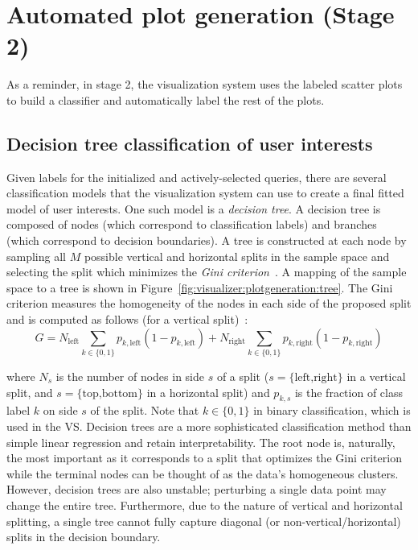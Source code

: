\section{Automated plot generation (Stage 2)}
\label{sec:visualizer:plotgeneration}

As a reminder, in stage 2, the visualization system uses the labeled scatter 
plots to build a classifier and automatically label the rest of the plots.

\subsection{Decision tree classification of user interests}
\label{sec:visualizer:plotgeneration:tree}

Given labels for the initialized and actively-selected queries, there are 
several classification models that the visualization system can use to create a 
final fitted model of user interests. One such model is a \textit{decision 
tree}. A decision tree is composed of nodes (which correspond to 
classification labels) and branches (which correspond to decision boundaries). 
A tree is constructed at each node by sampling all $M$ possible vertical and 
horizontal splits in the sample space and selecting the split which minimizes 
the \textit{Gini criterion}~\cite{cutler2010}. A mapping of the sample space to 
a tree is shown in Figure~\ref{fig:visualizer:plotgeneration:tree}. The Gini 
criterion measures the homogeneity of the nodes in each side of the proposed 
split and is computed as follows (for a vertical split)~\cite{cutler2010}:
$$G = N_{\text{left}} \sum\limits_{k\in \{0,1\}} p_{k,\text{left}} 
(1-p_{k,\text{left}}) + N_{\text{right}} 
\sum\limits_{k \in \{0,1\}}  p_{k,\text{right}}(1-p_{k,\text{right}})$$

\noindent where $N_s$ is the number of nodes in side $s$ of a split ($s = 
\{\text{left,right}\}$ in a vertical split, and $s = \{\text{top,bottom}\}$ in 
a horizontal split) and $p_{k,s}$ is the fraction of class label $k$ on side 
$s$ of the split. Note that $k \in \{0,1\}$ in binary classification, which is 
used in the VS. Decision trees are a more sophisticated classification method 
than simple linear regression and retain interpretability. The root node is, 
naturally, the most important as it corresponds to a split that optimizes the 
Gini criterion while the terminal nodes can be thought of as the data's 
homogeneous clusters. However, decision trees are also unstable; perturbing a 
single data point may change the entire tree. Furthermore, due to the nature of 
vertical and horizontal splitting, a single tree cannot fully capture diagonal 
(or non-vertical/horizontal) splits in the decision boundary.


